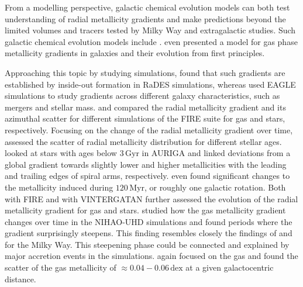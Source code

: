 \documentclass[fleqn,usenatbib]{mnras}
\begin{document}
From a modelling perspective, galactic chemical evolution models can both test understanding of radial metallicity gradients and make predictions beyond the limited volumes and tracers tested by Milky Way and extragalactic studies. Such galactic chemical evolution models include \citet{Chiappini2001, Matteucci2001b, Minchev2014b, Kubryk2015, Stanghellini2015, Rybizki2017, Johnson2024}. \citet{Sharda2021} even presented a model for gas phase metallicity gradients in galaxies and their evolution from first principles. 

Approaching this topic by studying simulations, \citet{Pilkington2012} found that such gradients are established by inside-out formation in RaDES simulations, whereas \citet{Tissera2019} used EAGLE simulations to study gradients across different galaxy characteristics, such as mergers and stellar mass. \citet{Bellardini2021} and \citet{Bellardini2022, Graf2024} compared the radial metallicity gradient and its azimuthal scatter for different simulations of the FIRE suite for gas and stars, respectively. Focusing on the change of the radial metallicity gradient over time, \citet{Grand2015} assessed the scatter of radial metallicity distribution for different stellar ages. \citet{Grand2016} looked at stars with ages below $3\,\mathrm{Gyr}$ in AURIGA and linked deviations from a global gradient towards slightly lower and higher metallicities with the leading and trailing edges of spiral arms, respectively. \citet{Grand2016} even found significant changes to the metallicity induced during $120\,\mathrm{Myr}$, or roughly one galactic rotation. Both \citet[][see their Fig. 6]{Ma2017} with FIRE and \citet[see their Fig. 9;][]{Agertz2021} with VINTERGATAN further assessed the evolution of the radial metallicity gradient for gas and stars. \citet{Buck2023} studied how the gas metallicity gradient changes over time in the NIHAO-UHD simulations and found periods where the gradient surprisingly steepens. This finding resembles closely the findings of \citet{Lu2022} and \citet{Ratcliffe2023} for the Milky Way. This steepening phase could be connected and explained by major accretion events in the simulations. \citet{Khoperskov2023e} again focused on the gas and found the scatter of the gas metallicity of $\approx 0.04-0.06\,\mathrm{dex}$ at a given galactocentric distance.
\end{document}
